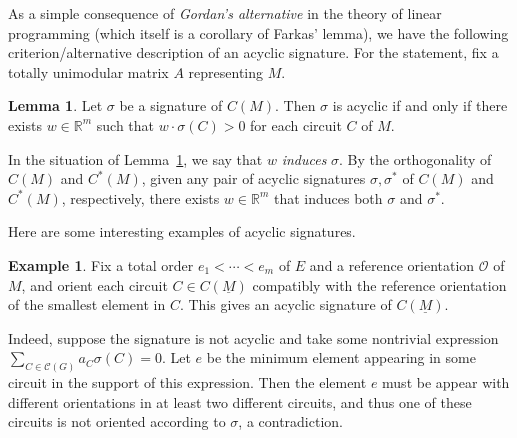 \documentclass[12pt]{amsart}
\numberwithin{equation}{section}
\theoremstyle{definition}
\newtheorem{lemma}[theorem]{Lemma}
\newtheorem{example}[theorem]{Example}
\begin{document}
\medskip

As a simple consequence of {\em Gordan's alternative} in the theory of linear programming \cite[p.~478]{bjorner1999oriented} (which itself is a corollary of Farkas' lemma), we have the following criterion/alternative description of an acyclic signature. For the statement, fix a totally unimodular matrix $A$ representing $M$.

\begin{lemma} \label{lem:gordan}
Let $\sigma$ be a signature of $C(M)$. Then $\sigma$ is acyclic if and only if there exists $w \in {\mathbb R}^m$ such that $w\cdot\sigma(C)>0$ for each circuit $C$ of $M$. 
\end{lemma}

In the situation of Lemma~\ref{lem:gordan}, we say that $w$ {\em induces} $\sigma$. 
By the orthogonality of $C(M)$ and $C^*(M)$, given any pair of acyclic signatures $\sigma,\sigma^*$ of $C(M)$ and $C^*(M)$, respectively, there exists $w \in {\mathbb R}^m$ that induces both $\sigma$ and $\sigma^*$.

\medskip

Here are some interesting examples of acyclic signatures.

\medskip

\begin{example}\label{edgeorder}
Fix a total order $e_1 < \cdots < e_m$ of $E$ and a reference orientation ${\mathcal O}$ of $M$, and orient each circuit $C \in C(\underline{M})$ compatibly with the reference orientation of the smallest element in $C$.  This gives an acyclic signature of $C(\underline{M})$.

Indeed, suppose the signature is not acyclic and take some nontrivial expression $\sum_{C \in {\mathcal C}(G)} a_C \sigma(C) = 0$. Let $e$ be the minimum element appearing in some circuit in the support of this expression.  Then the element $e$ must be appear with different orientations in at least two different circuits, and thus one of these circuits is not oriented according to $\sigma$, a contradiction.
\end{example}
\end{document}
